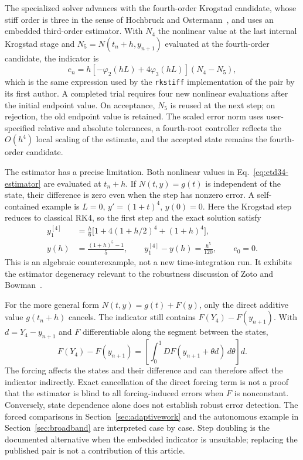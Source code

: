 The specialized solver advances with the fourth-order Krogstad candidate, whose
stiff order is three in the sense of Hochbruck and
Ostermann~\cite{HochbruckOstermann2005}, and uses an embedded third-order
estimator.  With $N_4$ the nonlinear value at the last internal Krogstad stage
and $N_5=N(t_n+h,y_{n+1})$ evaluated at the fourth-order candidate, the
indicator is
\begin{equation}
  e_n=h\left[-\varphi_2(hL)+4\varphi_3(hL)\right](N_4-N_5),
  \label{eq:etd34-estimator}
\end{equation}
which is the same expression used by the \texttt{rkstiff} implementation of the
pair by its first author.  A completed trial requires four new nonlinear
evaluations after the initial endpoint value.  On acceptance, $N_5$ is reused
at the next step; on rejection, the old endpoint value is retained.  The scaled
error norm uses user-specified relative and absolute tolerances, a fourth-root
controller reflects the $O(h^4)$ local scaling of the estimate, and the
accepted state remains the fourth-order candidate.

The estimator has a precise limitation.  Both nonlinear values in
Eq.~\eqref{eq:etd34-estimator} are evaluated at $t_n+h$.  If
$N(t,y)=g(t)$ is independent of the state, their difference is zero even when
the step has nonzero error.  A self-contained example is $L=0$,
$y'=(1+t)^4$, $y(0)=0$.  Here the Krogstad step reduces to classical RK4,
so the first step and the exact solution satisfy
\begin{equation}
\begin{aligned}
y_1^{[4]}&=\frac h6\bigl[1+4(1+h/2)^4+(1+h)^4\bigr],\\
y(h)&=\frac{(1+h)^5-1}{5},\qquad
y_1^{[4]}-y(h)=\frac{h^5}{120},\qquad e_0=0.
\end{aligned}\label{eq:etd34-forcing-counterexample}
\end{equation}
This is an algebraic counterexample, not a new time-integration run.  It
exhibits the estimator degeneracy relevant to the robustness discussion of
Zoto and Bowman~\cite{ZotoBowman2023}.

For the more general form $N(t,y)=g(t)+F(y)$, only the direct additive value
$g(t_n+h)$ cancels.  The indicator still contains
$F(Y_4)-F(y_{n+1})$.  With $d=Y_4-y_{n+1}$ and $F$ differentiable along the
segment between the states,
\begin{equation}
 F(Y_4)-F(y_{n+1})=
 \left[\int_0^1 DF(y_{n+1}+\theta d)\,d\theta\right]d.
 \label{eq:forcing-indirect}
\end{equation}
The forcing affects the states and their difference and can therefore affect
the indicator indirectly.  Exact cancellation of the direct forcing term is
not a proof that the estimator is blind to all forcing-induced errors when
$F$ is nonconstant.  Conversely, state dependence alone does not establish
robust error detection.  The forced comparisons in
Section~\ref{sec:adaptivework} and the autonomous example in
Section~\ref{sec:broadband} are interpreted case by case.  Step doubling is the
documented alternative when the embedded indicator is unsuitable; replacing
the published pair is not a contribution of this article.

